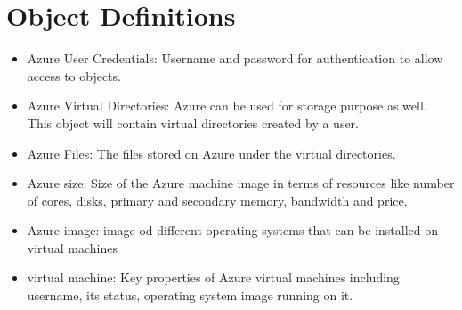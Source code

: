 \section{Object Definitions}
\begin{itemize}

\item Azure User Credentials: Username and password for authentication to allow
access to objects.

\item Azure Virtual Directories: Azure can be used for storage purpose as well.
This object will contain virtual directories created by a user.

\item Azure Files: The files stored on Azure under the virtual directories.

\item Azure size: Size of the Azure machine image in terms of resources like
number of cores, disks, primary and secondary memory, bandwidth and price.

\item Azure image: image od different operating systems that can be installed on
 virtual machines

\item virtual machine: Key properties of Azure virtual machines including
username, its status, operating system image running on it.


\end{itemize}




 

